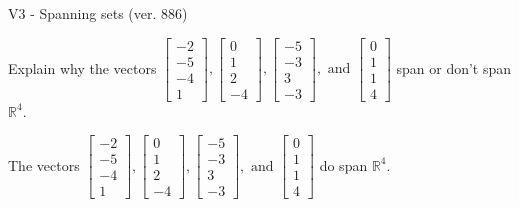 \begin{exercise}
  \begin{exerciseTitle}V3 - Spanning sets (ver. 886)\end{exerciseTitle}
  \begin{exerciseStatement}
    Explain why the vectors \(\left[\begin{array}{r}
-2 \\
-5 \\
-4 \\
1
\end{array}\right] , \left[\begin{array}{r}
0 \\
1 \\
2 \\
-4
\end{array}\right] , \left[\begin{array}{r}
-5 \\
-3 \\
3 \\
-3
\end{array}\right] , \text{ and } \left[\begin{array}{r}
0 \\
1 \\
1 \\
4
\end{array}\right]\) span or don't span \(\mathbb{R}^4\). 
	


  \end{exerciseStatement}
  \begin{exerciseAnswer}
   The vectors \(\left[\begin{array}{r}
-2 \\
-5 \\
-4 \\
1
\end{array}\right] , \left[\begin{array}{r}
0 \\
1 \\
2 \\
-4
\end{array}\right] , \left[\begin{array}{r}
-5 \\
-3 \\
3 \\
-3
\end{array}\right] , \text{ and } \left[\begin{array}{r}
0 \\
1 \\
1 \\
4
\end{array}\right]\) 
  	 do  
	span \(\mathbb{R}^4\).
  


  \end{exerciseAnswer}
\end{exercise}